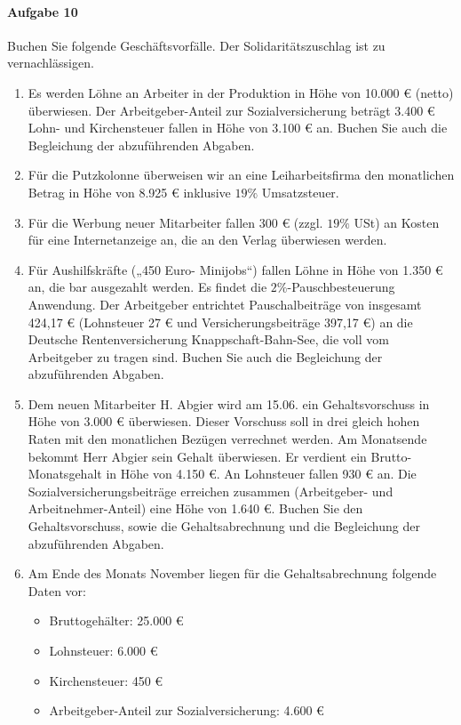 \documentclass[paper=a4, fontsize=11pt]{scrartcl}
\numberwithin{equation}{section}
\numberwithin{figure}{section}
\numberwithin{table}{section}
\begin{document}
\paragraph{Aufgabe 10}
Buchen Sie folgende Geschäftsvorfälle. Der Solidaritätszuschlag ist zu vernachlässigen. \\
\begin{enumerate}
\item Es werden Löhne an Arbeiter in der Produktion in Höhe von 10.000 € (netto) überwiesen. Der Arbeitgeber-Anteil zur Sozialversicherung beträgt 3.400 € Lohn- und Kirchensteuer fallen in Höhe von 3.100 € an. Buchen Sie auch die Begleichung der abzuführenden Abgaben.
\item Für die Putzkolonne überweisen wir an eine Leiharbeitsfirma den monatlichen Betrag in Höhe von 8.925 € inklusive $19 \%$ Umsatzsteuer. 
\item Für die Werbung neuer Mitarbeiter fallen 300 € (zzgl. $19 \%$ USt) an Kosten für eine Internetanzeige an, die an den Verlag überwiesen werden. 
\item Für Aushilfskräfte („450 Euro- Minijobs“) fallen Löhne in Höhe von 1.350 € an, die bar ausgezahlt werden. Es findet die $2 \%$-Pauschbesteuerung Anwendung. Der Arbeitgeber entrichtet Pauschalbeiträge von insgesamt 424,17 € (Lohnsteuer 27 € und Versicherungsbeiträge 397,17 €) an die Deutsche Rentenversicherung Knappschaft-Bahn-See, die voll vom Arbeitgeber zu tragen sind. Buchen Sie auch die Begleichung der abzuführenden Abgaben.
\item Dem neuen Mitarbeiter H. Abgier wird am 15.06. ein Gehaltsvorschuss in Höhe von 3.000 € überwiesen. Dieser Vorschuss soll in drei gleich hohen Raten mit den monatlichen Bezügen verrechnet werden. Am Monatsende bekommt Herr Abgier sein Gehalt überwiesen. Er verdient ein Brutto-Monatsgehalt in Höhe von 4.150 €. An Lohnsteuer fallen 930 € an. Die Sozialversicherungsbeiträge erreichen zusammen (Arbeitgeber- und Arbeitnehmer-Anteil) eine Höhe von 1.640 €. Buchen Sie den Gehaltsvorschuss, sowie die Gehaltsabrechnung und die Begleichung der abzuführenden Abgaben. 
\item Am Ende des Monats November liegen für die Gehaltsabrechnung folgende Daten vor:  
\begin{itemize}
 \item Bruttogehälter: 25.000 €   
 \item Lohnsteuer: 6.000 €   
 \item Kirchensteuer: 450 €   
 \item Arbeitgeber-Anteil zur Sozialversicherung: 4.600 € 

\end{itemize}
\end{enumerate}
\end{document}
